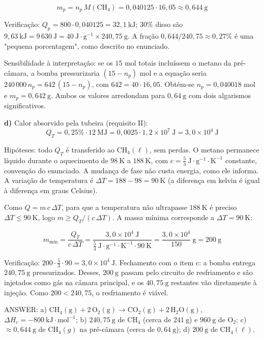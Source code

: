 \documentclass{article}%
\begin{document}
\[ m_p=n_p\,M(\mathrm{CH_4})=0{,}040125\cdot16{,}05\approx0{,}644\ \text{g} \]

Verificação: $Q_p=800\cdot0{,}040125=32{,}1\ \text{kJ}$; $30\%$ disso são $9{,}63\ \text{kJ}=9\,630\ \text{J}=40\ \text{J}\cdot\text{g}^{-1}\times240{,}75\ \text{g}$. A fração $0{,}644/240{,}75\approx0{,}27\%$ é uma "pequena porcentagem", como descrito no enunciado.

Sensibilidade à interpretação: se os $15$ mol totais incluíssem o metano da pré-câmara, a bomba pressurizaria $(15-n_p)$ mol e a equação seria $240\,000\,n_p=642\,(15-n_p)$, com $642=40\cdot16{,}05$. Obtém-se $n_p=0{,}040018$ mol e $m_p=0{,}642\ \text{g}$. Ambos os valores arredondam para $0{,}64\ \text{g}$ com dois algarismos significativos.

\textbf{d)} Calor absorvido pela tubeira (requisito II):
\[ Q_T=0{,}25\%\cdot12\ \text{MJ}=0{,}0025\cdot1{,}2\times10^{7}\ \text{J}=3{,}0\times10^{4}\ \text{J} \]

Hipóteses: todo $Q_T$ é transferido ao CH$_4(\ell)$, sem perdas. O metano permanece líquido durante o aquecimento de $98\ \text{K}$ a $188\ \text{K}$, com $c=\tfrac{5}{3}\ \text{J}\cdot\text{g}^{-1}\cdot\text{K}^{-1}$ constante, convenção do enunciado. A mudança de fase não custa energia, como ele informa. A variação de temperatura é $\Delta T=188-98=90\ \text{K}$ (a diferença em kelvin é igual à diferença em graus Celsius).

Como $Q=m\,c\,\Delta T$, para que a temperatura não ultrapasse $188\ \text{K}$ é preciso $\Delta T\le90\ \text{K}$, logo $m\ge Q_T/(c\,\Delta T)$. A massa mínima corresponde a $\Delta T=90\ \text{K}$:

\[ m_{\min}=\frac{Q_T}{c\,\Delta T}=\frac{3{,}0\times10^{4}\ \text{J}}{\tfrac{5}{3}\ \text{J}\cdot\text{g}^{-1}\cdot\text{K}^{-1}\cdot90\ \text{K}}=\frac{3{,}0\times10^{4}}{150}\ \text{g}=200\ \text{g} \]

Verificação: $200\cdot\tfrac{5}{3}\cdot90=3{,}0\times10^{4}\ \text{J}$. Fechamento com o item c: a bomba entrega $240{,}75\ \text{g}$ pressurizados. Desses, $200\ \text{g}$ passam pelo circuito de resfriamento e são injetados como gás na câmara principal, e os $40{,}75\ \text{g}$ restantes vão diretamente à injeção. Como $200<240{,}75$, o resfriamento é viável.

ANSWER: a) $\mathrm{CH_4(g)}+2\,\mathrm{O_2(g)}\rightarrow\mathrm{CO_2(g)}+2\,\mathrm{H_2O(g)}$, $\Delta H_c=-800\ \text{kJ}\cdot\text{mol}^{-1}$; b) $240{,}75\ \text{g}$ de CH$_4$ (cerca de $241\ \text{g}$) e $960\ \text{g}$ de O$_2$; c) $\approx0{,}644\ \text{g}$ de CH$_4(g)$ na pré-câmara (cerca de $0{,}64\ \text{g}$); d) $200\ \text{g}$ de CH$_4(\ell)$.%
\newpage%
\end{document}
